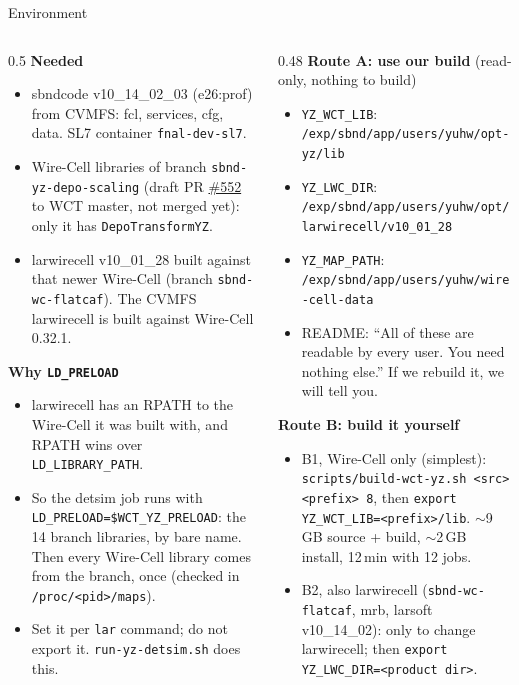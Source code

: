\documentclass[aspectratio=169,10pt]{beamer}
\newcommand{\code}[1]{\texttt{#1}}
\begin{document}
\begin{frame}[fragile]{Environment}
\footnotesize
\begin{columns}[T]
\begin{column}{0.5\textwidth}
\textbf{Needed}
\begin{itemize}
\item sbndcode v10\_14\_02\_03 (e26:prof) from CVMFS: fcl, services, cfg, data. SL7 container \code{fnal-dev-sl7}.
\item Wire-Cell libraries of branch \code{sbnd-yz-depo-scaling} (draft PR \href{https://github.com/WireCell/wire-cell-toolkit/pull/552}{\#552} to WCT master, not merged yet): only it has \code{DepoTransformYZ}.
\item larwirecell v10\_01\_28 built against that newer Wire-Cell (branch \code{sbnd-wc-flatcaf}). The CVMFS larwirecell is built against Wire-Cell 0.32.1.
\end{itemize}
\textbf{Why \code{LD\_PRELOAD}}
\begin{itemize}
\item larwirecell has an RPATH to the Wire-Cell it was built with, and RPATH wins over \code{LD\_LIBRARY\_PATH}.
\item So the detsim job runs with \code{LD\_PRELOAD=\$WCT\_YZ\_PRELOAD}: the 14 branch libraries, by bare name. Then every Wire-Cell library comes from the branch, once (checked in \code{/proc/<pid>/maps}).
\item Set it per \code{lar} command; do not export it. \code{run-yz-detsim.sh} does this.
\end{itemize}
\end{column}
\begin{column}{0.48\textwidth}
\textbf{Route A: use our build} (read-only, nothing to build)
\begin{itemize}
\item \code{YZ\_WCT\_LIB}: \code{/exp/sbnd/app/users/yuhw/opt-yz/lib}
\item \code{YZ\_LWC\_DIR}: \code{/exp/sbnd/app/users/yuhw/opt/}\\\code{larwirecell/v10\_01\_28}
\item \code{YZ\_MAP\_PATH}: \code{/exp/sbnd/app/users/yuhw/wire-cell-data}
\item README: ``All of these are readable by every user. You need nothing else.'' If we rebuild it, we will tell you.
\end{itemize}
\textbf{Route B: build it yourself}
\begin{itemize}
\item B1, Wire-Cell only (simplest): \code{scripts/build-wct-yz.sh <src> <prefix> 8}, then \code{export YZ\_WCT\_LIB=<prefix>/lib}. $\sim$9\,GB source + build, $\sim$2\,GB install, 12\,min with 12 jobs.
\item B2, also larwirecell (\code{sbnd-wc-flatcaf}, mrb, larsoft v10\_14\_02): only to change larwirecell; then \code{export YZ\_LWC\_DIR=<product dir>}.
\end{itemize}
\end{column}
\end{columns}
\end{frame}
\end{document}
